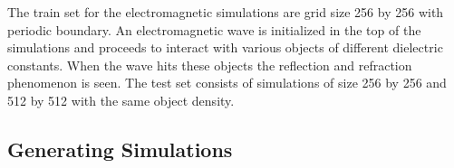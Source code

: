 \documentclass{article}
\begin{document}
The train set for the electromagnetic simulations are grid size 256 by 256 with periodic boundary. An electromagnetic wave is initialized in the top of the simulations and proceeds to interact with various objects of different dielectric constants. When the wave hits these objects the reflection and refraction phenomenon is seen. The test set consists of simulations of size 256 by 256 and 512 by 512 with the same object density.

\subsection{Generating Simulations}

\begin{figure}[!t]
\centering
{}

\end{figure}
\end{document}
